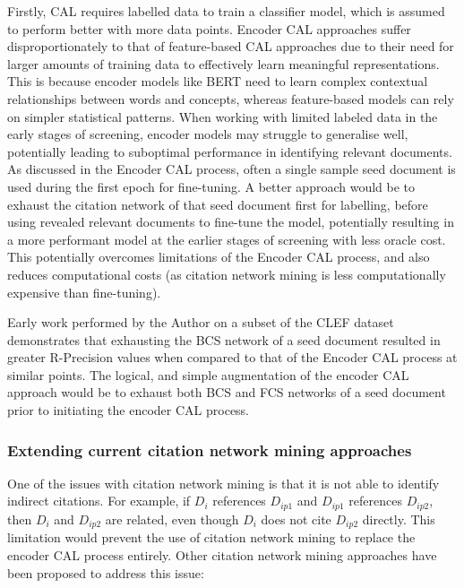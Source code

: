 \documentclass[../main.tex]{subfiles}
\begin{document}
Firstly, CAL requires labelled data to train a classifier model, which is assumed to perform better with more data points. Encoder CAL approaches suffer disproportionately to that of feature-based CAL approaches due to their need for larger amounts of training data to effectively learn meaningful representations. This is because encoder models like BERT need to learn complex contextual relationships between words and concepts, whereas feature-based models can rely on simpler statistical patterns. When working with limited labeled data in the early stages of screening, encoder models may struggle to generalise well, potentially leading to suboptimal performance in identifying relevant documents. As discussed in the Encoder CAL process, often a single sample seed document is used during the first epoch for fine-tuning. A better approach would be to exhaust the citation network of that seed document first for labelling, before using revealed relevant documents to fine-tune the model, potentially resulting in a more performant model at the earlier stages of screening with less oracle cost. This potentially overcomes limitations of the Encoder CAL process, and also reduces computational costs (as citation network mining is less computationally expensive than fine-tuning). 

Early work performed by the Author on a subset of the CLEF dataset demonstrates that exhausting the BCS network of a seed document resulted in greater R-Precision values when compared to that of the Encoder CAL process at similar points. The logical, and simple augmentation of the encoder CAL approach would be to exhaust both BCS and FCS networks of a seed document prior to initiating the encoder CAL process. 
\subsubsection{Extending current citation network mining approaches}



One of the issues with citation network mining is that it is not able to identify indirect citations. For example, if $D_i$ references $D_{ip1}$ and $D_{ip1}$ references $D_{ip2}$, then $D_i$ and $D_{ip2}$ are related, even though $D_i$ does not cite $D_{ip2}$ directly. This limitation would prevent the use of citation network mining to replace the encoder CAL process entirely. Other citation network mining approaches have been proposed to address this issue:
\end{document}
